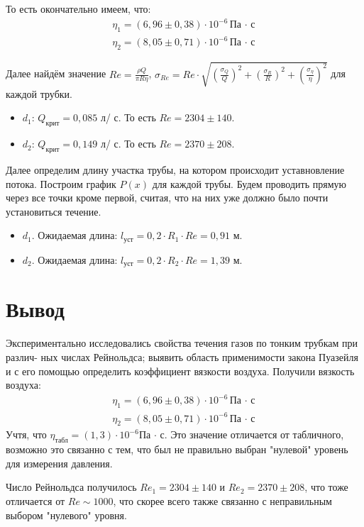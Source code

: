 \documentclass[a4paper,12pt]{article} %
\begin{document}
То есть окончательно имеем, что: 
\begin{align*}
  \eta_1 = (6,96 \pm 0,38) \cdot 10^{-6} \text{Па $\cdot $ с} \\
  \eta_2 = (8,05 \pm 0,71) \cdot 10^{-6} \text{Па $\cdot $ с}
\end{align*}

Далее найдём значение $Re = \frac{\rho Q}{\pi R \eta}$, $\sigma_{Re} = Re \cdot \sqrt{{\left( \frac{\sigma_Q}{Q} \right)} ^ 2 + {\left( \frac{\sigma_R}{R} \right)} ^ 2 + {\left( \frac{\sigma_\eta}{\eta} \right)} ^ 2}$ для каждой трубки.

\begin{itemize}
  \item $d_1$: $Q_\text{крит} = 0,085$ л/ с. То есть $Re = 2304 \pm 140$. 
  \item $d_2$: $Q_\text{крит} = 0,149$ л/ с. То есть $Re = 2370 \pm 208$.
\end{itemize}


Далее определим длину участка трубы, на котором происходит уставновление потока. Построим график $P(x)$ для каждой трубы. Будем проводить прямую через все точки кроме первой, считая, что на них уже должно было почти установиться течение.

\newpage
\begin{itemize}
  \item $d_1$. Ожидаемая длина: $l_{\text{уст}} = 0,2 \cdot R_1 \cdot Re = 0,91$ м.
  \item $d_2$. Ожидаемая длина: $l_{\text{уст}} = 0,2 \cdot R_2 \cdot Re = 1,39$ м.
\end{itemize}

\section*{Вывод}

Экспериментально исследовались свойства течения газов по тонким трубкам при различ-
ных числах Рейнольдса; выявить область применимости закона Пуазейля и с его помощью
определить коэффициент вязкости воздуха. Получили вязкость воздуха:
\begin{align*}
  \eta_1 = (6,96 \pm 0,38) \cdot 10^{-6} \text{Па $\cdot $ с} \\
  \eta_2 = (8,05 \pm 0,71) \cdot 10^{-6} \text{Па $\cdot $ с}
\end{align*}
Учтя, что $\eta_\text{табл} = (1,3) \cdot 10^{-6} $Па $\cdot $ с. Это значение отличается от табличного, возможно это связанно с тем, что был не правильно выбран "нулевой" уровень для измерения давления.

Число Рейнольдса получилось $Re_1 = 2304 \pm 140$ и $Re_2 = 2370 \pm 208$, что тоже отличается от $Re \sim 1000$, что скорее всего также связанно с неправильным выбором "нулевого" уровня.


\end{document}

